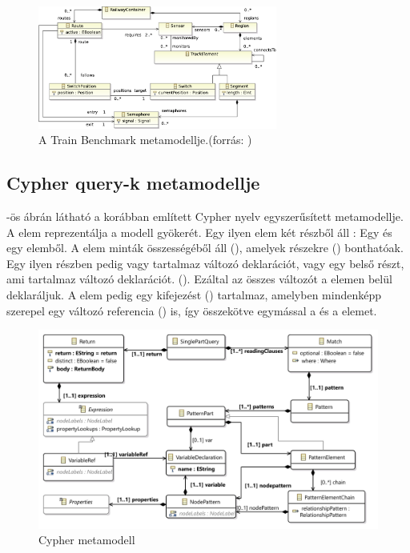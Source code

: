 \begin{figure}
	\centering
	\includegraphics[width=0.7\textwidth]{figures/trainbenchmarkfig2}
	\caption{A Train Benchmark metamodellje.(forrás: \cite{szarnyas2018train})}
	\label{fig:trainbenchmarkmetamodell}
\end{figure}

\subsection{Cypher query-k metamodellje}

 -ös ábrán látható a korábban említett Cypher nyelv egyszerűsített metamodellje.
A  elem reprezentálja a modell gyökerét. Egy ilyen elem két részből áll : Egy  
és egy  elemből. A  elem minták összességéből áll (), amelyek 
részekre () bonthatóak. Egy ilyen részben pedig vagy tartalmaz változó deklarációt,
vagy egy belső részt, ami tartalmaz változó deklarációt. ().
Ezáltal az összes változót a  elemen belül deklaráljuk. A  elem  pedig egy
kifejezést () tartalmaz, amelyben mindenképp szerepel egy változó referencia
 () is, így összekötve egymással a  és a  elemet. 

\begin{figure}
	\centering
	\includegraphics[width=1\textwidth]{figures/openCypherClassDiagram}
	\caption{Cypher metamodell}
	\label{fig:cyphermetamodell}
\end{figure}



